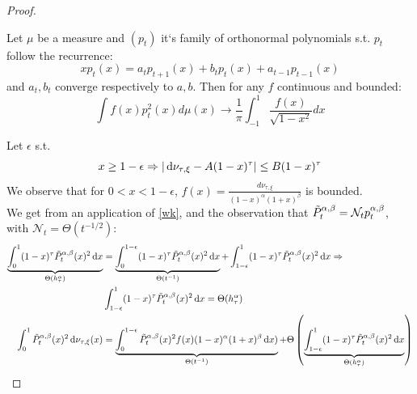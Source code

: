 \documentclass{article}
\begin{document}
\begin{proof}
\begin{lemma}
 Let $\mu$ be a measure and $(p_t)$ it`s family of orthonormal polynomials s.t.  $p_t$ follow the recurrence:
 \begin{equation*}
     xp_t(x)=a_tp_{t+1}(x)+b_tp_t(x)+a_{t-1}p_{t-1}(x)
 \end{equation*}
 and $a_t,b_t$ converge respectively to $a,b$. Then for any $f$  continuous and bounded:
\begin{equation}
    \int f(x)p_t^2(x)d\mu(x) \rightarrow \frac{1}{\pi}\int_{-1}^1 \frac{f(x)}{\sqrt{1-x^2}}dx   
\end{equation}
\label{wk}
\end{lemma} 
 Let $\epsilon$ s.t.
\begin{equation}
    x\geq 1-\epsilon \Rightarrow |\mathop{}\!\mathrm{d}\nu_{\tau,\xi}-A(1-x)^\tau|\leq  B(1-x)^\tau \label{eq: epsilon}
\end{equation}
We observe that for $0<x<1-\epsilon$, $f(x)=\frac{d\nu_{\tau,\xi}}{(1-x)^\alpha(1+x)^\beta}$ is bounded. \\
We get from an application of \ref{wk}, and the observation that $\Tilde{P}_t^{\alpha,\beta}=\mathcal{N}_tp_t^{\alpha,\beta}$, with $\mathcal{N}_t=\Theta(t^{-1/2})$:
\begin{align}
    \underbrace{\int_0^1(1-x)^\tau\Tilde{P}_t^{\alpha,\beta}(x)^2\mathop{}\!\mathrm{d} x}_{\Theta( h_\tau^\alpha)}&=\underbrace{\int_0^{1-\epsilon}(1-x)^\tau\Tilde{P}_t^{\alpha,\beta}(x)^2\mathop{}\!\mathrm{d} x}_{\Theta( t^{-1})
    } +\int_{1-\epsilon}^1(1-x)^\tau\Tilde{P}_t^{\alpha,\beta}(x)^2\mathop{}\!\mathrm{d} x \Rightarrow\\
    &\int_{1-\epsilon}^1(1-x)^\tau\Tilde{P}_t^{\alpha,\beta}(x)^2\mathop{}\!\mathrm{d} x  =\Theta( h_\tau^\alpha) \\
    \int_0^1 \Tilde{P}_t^{\alpha,\beta}(x)^2\mathop{}\!\mathrm{d}\nu_{\tau,\xi}(x)&=
    \underbrace{\int_0^{1-\epsilon} \Tilde{P}_t^{\alpha,\beta}(x)^2 f(x) (1-x)^\alpha(1+x)^\beta\mathop{}\!\mathrm{d} x)}_{\Theta( t^{-1})
    }+\Theta\left(
    \underbrace{\int_{1-\epsilon}^1(1-x)^\tau\Tilde{P}_t^{\alpha,\beta}(x)^2\mathop{}\!\mathrm{d} x}_{\Theta( h_\tau^\alpha)}\right)
\end{align}


\end{proof}
\end{document}
